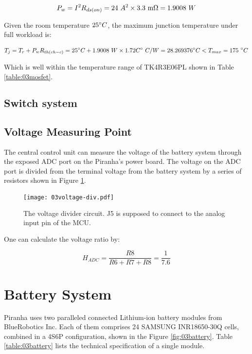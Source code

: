 \begin{equation}
    P_w=I^2 R_{ds(on)}=24\ A^2 \times 3.3\ {\rm m}\Omega=1.9008\ W
\end{equation}

Given the room temperature $25\degree C$, the maximum junction temperature under full workload is:

\begin{equation}
    T_j=T_r+P_w R_{th(ch-c)}=25\degree C+1.9008\ W\times 1.72C\degree\ C/W=28.269376 \degree C < T_{max} = 175\ \degree C
\end{equation}

Which is well within the temperature range of TK4R3E06PL shown in Table \ref{table:03mosfet}.

\subsection{Switch system}

\subsection{Voltage Measuring Point}

The central control unit can measure the voltage of the battery system through the exposed ADC port on the Piranha's power board. The voltage on the ADC port is divided from the terminal voltage from the battery system by a series of resistors shown in Figure \ref{fig:03voltage-div}.

\begin{figure}[ht]
    \centering
    \texttt{[image: 03voltage-div.pdf]}
    \caption{The voltage divider circuit. J5 is supposed to connect to the analog input pin of the MCU.}
    \label{fig:03voltage-div}
\end{figure}

One can calculate the voltage ratio by:

\begin{equation}
    H_{ADC}=\frac{R8}{R6+R7+R8}=\frac{1}{7.6}
\end{equation}

\section{Battery System}

Piranha uses two paralleled connected Lithium-ion battery modules from BlueRobotics Inc. Each of them comprises 24 SAMSUNG INR18650-30Q cells, combined in a 4S6P configuration, shown in the Figure \ref{fig:03battery}. Table \ref{table:03battery} lists the technical specification of a single module.

